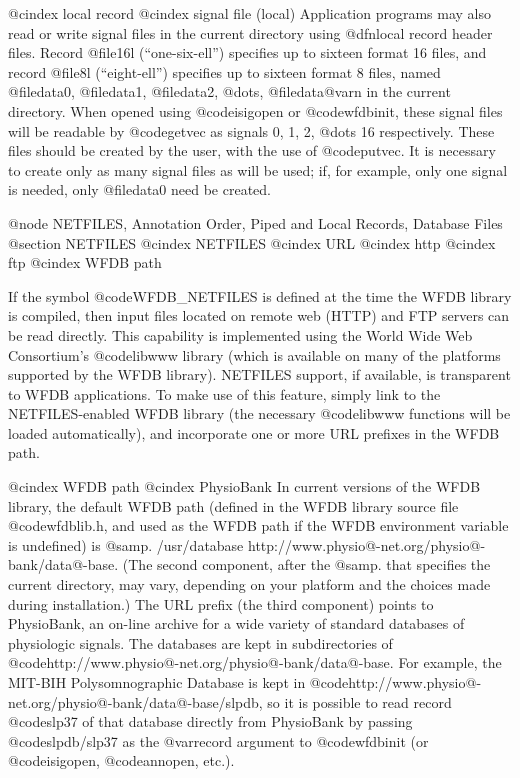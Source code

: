 {{{{{{{{{{@cindex local record
@cindex signal file (local)
Application programs may also read or write signal files in the current
directory using @dfn{local record} header files.  Record
@file{16l} (``one-six-ell'') specifies up to sixteen format 16
files, and record @file{8l} (``eight-ell'') specifies up to
sixteen format 8 files, named @file{data0}, @file{data1},
@file{data2}, @dots{}, @file{data@var{n}} in the current directory.
When opened using @code{isigopen} or @code{wfdbinit}, these signal files
will be readable by @code{getvec} as signals 0, 1, 2, @dots{} 16
respectively.  These files should be created by the user, with the use
of @code{putvec}.  It is necessary to create only as many signal files
as will be used; if, for example, only one signal is needed, only
@file{data0} need be created.


@node     NETFILES, Annotation Order, Piped and Local Records, Database Files
@section NETFILES
@cindex NETFILES
@cindex URL
@cindex http
@cindex ftp
@cindex WFDB path

If the symbol @code{WFDB_NETFILES} is defined at the time the WFDB library is
compiled, then input files located on remote web (HTTP) and FTP servers can be
read directly.  This capability is implemented using the World Wide Web
Consortium's @code{libwww} library (which is available on many of the platforms
supported by the WFDB library).  NETFILES support, if available, is transparent
to WFDB applications.  To make use of this feature, simply link to the
NETFILES-enabled WFDB library (the necessary @code{libwww} functions will be
loaded automatically), and incorporate one or more URL prefixes in the WFDB
path.

@cindex WFDB path
@cindex PhysioBank
In current versions of the WFDB library, the default WFDB path (defined in the
WFDB library source file @code{wfdblib.h}, and used as the WFDB path if the
WFDB environment variable is undefined) is @samp{. /usr/database
http://www.physio@-net.org/physio@-bank/data@-base}.  (The second component,
after the @samp{.} that specifies the current directory, may vary, depending on
your platform and the choices made during installation.)  The URL prefix (the
third component) points to PhysioBank, an on-line archive for a wide variety of
standard databases of physiologic signals.  The databases are kept in
subdirectories of @code{http://www.physio@-net.org/physio@-bank/data@-base}.
For example, the MIT-BIH Polysomnographic Database is kept in
@code{http://www.physio@-net.org/physio@-bank/data@-base/slpdb}, so it is
possible to read record @code{slp37} of that database directly from PhysioBank
by passing @code{slpdb/slp37} as the @var{record} argument to @code{wfdbinit}
(or @code{isigopen}, @code{annopen}, etc.).

}}}}}}}}}}
